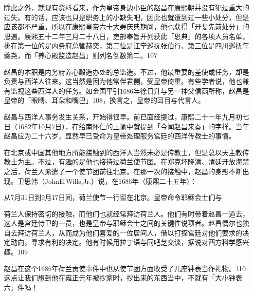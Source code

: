 除此之外，就现有资料看来，作为皇帝身边小臣的赵昌在康熙朝并没有犯过重大的过失。有的话，应该也只是职务上的小缺失吧，因此也就遭到过一些小处分，但是应该都不严重，所以在康熙皇帝六十大寿庆典期间，他也获得「开复先前处分」的恩遇。康熙五十二年三月二十八日，吏部奉旨开列获此「恩典」的各项人员名单，排在第一位的是内务府总管赫奕，第二位是江宁巡抚张伯行、第三位是四川巡抚年羹尧，而「养心殿监造赵昌」则列名倒数第二。107

赵昌的本职是内务府养心殿造办处的总监造。不过，他最重要的差使或任务，却是负责与西洋人往来。这当然是因为他常伴君侧，受皇帝倚重。有些学者说，他也兼有监视这些西洋人的任务。如金国平引1686年徐日升与另一神父信函所称，赵昌是皇帝的「眼睛、耳朵和嘴巴」108，换言之，皇帝的耳目与代言人。


赵昌与西洋人事务发生关系，开始得很早。前已面经提过，康熙二十一年九月初七日（1682年10月7日），在给南怀仁的上谕中就提到「今闻赵昌来奏」的字样。当年赵昌应为二十六岁，显然早已受命为皇帝处理服务宫廷的西洋传教士的事情。

在北京或中国其他地方所能接触到的西洋人当然未必是传教士，但是总以天主教传教士为主。不过，有趣的是他也接待过荷兰使节团。在郑克坏降清、清廷开放海禁之后，荷兰人派遣了一个使节团前往北京。在那一次的接触中，赵昌的身影不断出现。卫思韩（JohnE.Wills,Jr.）说，在1686年（康熙二十五年）：

\begin{BookQuote}
从7月31日到9月17日间，荷兰使节一行留在北京。皇帝命令耶稣会士们与
\end{BookQuote}

\vfill
\begin{BookNotes}
\end{BookNotes}

\begin{BookQuote}
荷兰人保持密切的接触，而他们也就经常拜访荷兰人。他们有时带着赵昌一道去，这人是宫廷侍卫的一员，也是皇帝与耶稣会士之间的关键性说项者。赵昌偶尔也独自去拜访荷兰人，从而成为他们喜爱的一位居间人，借以打探宫廷对他们要求的决定动向，寻求有利的决定。他有时候用拉丁语与同吧芝交谈，据说对西方科学感兴趣。109
\end{BookQuote}

赵昌在这个1686年荷兰贡使事件中也从使节团方面收受了几座钟表当作礼物。110这点让我们想到他在雍正元年被抄家时，抄出来的东西当中，不就有「大小钟表六」件吗！

